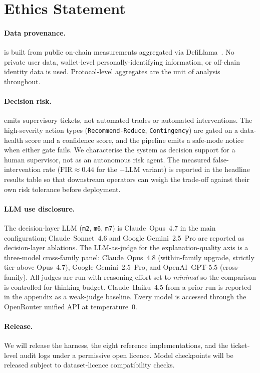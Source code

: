 \section*{Ethics Statement}
\label{sec:ethics}

\paragraph{Data provenance.}
\corpusname{} is built from public on-chain measurements
aggregated via DefiLlama~\citep{DefiLlama2026}. No private user data,
wallet-level personally-identifying information, or off-chain
identity data is used. Protocol-level aggregates are the unit of
analysis throughout.

\paragraph{Decision risk.}
\sysname{} emits supervisory tickets, not automated trades or
automated interventions. The high-severity action types
(\texttt{Recommend-Reduce}, \texttt{Contingency}) are gated on a
data-health score and a confidence score, and the pipeline emits a
safe-mode notice when either gate fails. We characterise the system
as decision support for a human supervisor, not as an autonomous
risk agent. The measured false-intervention rate
($\mathrm{FIR}\!\approx\!0.44$ for the \fmname$+$LLM variant) is
reported in the headline results table so that downstream operators
can weigh the trade-off against their own risk tolerance before
deployment.

\paragraph{LLM use disclosure.}
The decision-layer LLM (\texttt{m2}, \texttt{m6}, \texttt{m7}) is
Claude~Opus~4.7 in the main configuration; Claude~Sonnet~4.6 and
Google Gemini~2.5~Pro are reported as decision-layer ablations.
The LLM-as-judge for the explanation-quality axis is a
three-model cross-family panel: Claude~Opus~4.8 (within-family
upgrade, strictly tier-above Opus~4.7), Google Gemini~2.5~Pro,
and OpenAI~GPT-5.5 (cross-family). All judges are run with
reasoning effort set to \emph{minimal} so the comparison is
controlled for thinking budget. Claude~Haiku~4.5 from a prior
run is reported in the appendix as a weak-judge baseline. Every
model is accessed through the OpenRouter unified API at
temperature~$0$.

\paragraph{Release.}
We will release the harness, the eight reference implementations,
and the ticket-level audit logs under a permissive open licence.
Model checkpoints will be released subject to dataset-licence
compatibility checks.
